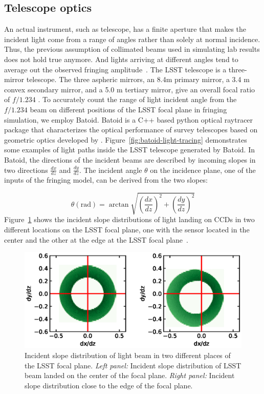 \documentclass[twocolumn]{aastex63} %
\begin{document}
\begin{CJK*}{UTF8}{gbsn}
\subsection{Telescope optics} \label{sec:LSST optic}



An actual instrument, such as telescope, has a finite aperture that makes the incident light come from a range of angles rather than solely at normal incidence. Thus, the previous assumption of collimated beams used in simulating lab results does not hold true anymore. And lights arriving at different angles tend to average out the observed fringing amplitude~\citep{Groom17}. The LSST telescope is a three-mirror telescope. The three aspheric mirrors, an 8.4m primary mirror, a 3.4 m convex secondary mirror, and a 5.0 m tertiary mirror, give an overall focal ratio of $f/1.234$ \citep{Bond18,Ivezi19,Olivier08}. To accurately count the range of light incident angle from the $f/1.234$ beam on different positions of the LSST focal plane in fringing simulation, we employ Batoid. Batoid is a C++ based python optical raytracer package that characterizes the optical performance of survey telescopes based on geometric optics developed by \citet{Mayers19}. Figure~\ref{fig:batoid-light-tracing} demonstrates some examples of light paths inside the LSST telescope generated by Batoid. In Batoid, the directions of the incident beams are described by incoming slopes in two directions $\frac{dx}{dz}$ and $\frac{dy}{dz}$. The incident angle $\theta$ on the incidence plane, one of the inputs of the fringing model, can be derived from the two slopes: 

\begin{equation*}
    \theta (\mbox{rad}) = \arctan{\sqrt{\left(\frac{dx}{dz}\right)^2+\left(\frac{dy}{dz}\right)^2}}
\end{equation*}
Figure~\ref{fig:batoid-angle-dist} shows the incident slope distributions of light landing on CCDs in two different locations on the LSST focal plane, one with the sensor located in the center and the other at the edge at the LSST focal plane~\citep{Ivezi19}.

\begin{figure}[t]
\centering
\includegraphics[scale = 0.55]{batoid_angle_dists.eps}
\caption{Incident slope distribution of light beam in two different places of the LSST focal plane. {\it Left panel:} Incident slope distribution of LSST beam landed on the center of the focal plane. {\it Right panel:} Incident slope distribution close to the edge of the focal plane.}
\label{fig:batoid-angle-dist}
\end{figure}


\end{CJK*}
\end{document}
